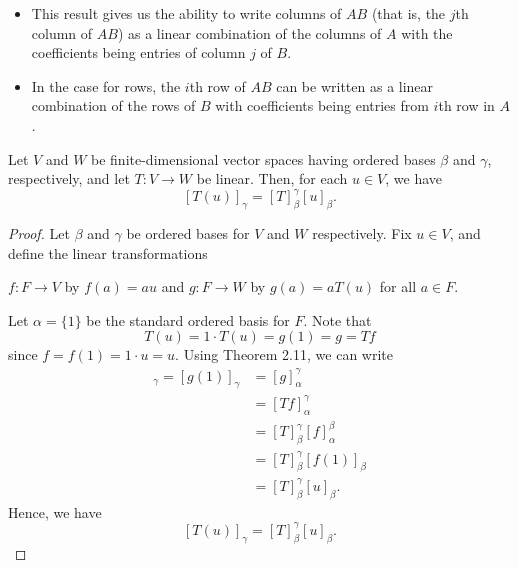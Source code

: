 \begin{itemize}
    \item This result gives us the ability to write columns of \( AB  \) (that is, the \( j \)th column of \( AB \)) as a linear combination of the columns of \( A  \) with the coefficients being entries of column \( j  \) of \( B  \).
    \item In the case for rows, the \( i \)th row of \( AB  \) can be written as a linear combination of the rows of \( B  \) with coefficients being entries from \( i \)th row in \( A  \).
\end{itemize}

\begin{theorem}
    Let \( V  \) and \( W  \) be finite-dimensional vector spaces having ordered bases \( \beta  \) and \( \gamma  \), respectively, and let \( T: V \to W  \) be linear. Then, for each \( u \in V  \), we have
    \[  [T(u)]_{\gamma}^{}  = [T]_{\beta}^{\gamma}  [u]_{\beta}^{}. \]
\end{theorem}
\begin{proof}
    Let \( \beta \) and \( \gamma \) be ordered bases for \( V  \) and \( W  \) respectively. Fix \( u \in V  \), and define the linear transformations 
    \begin{center}
        \( f: F \to V  \) by \( f(a) = au  \) and \( g: F \to W  \) by \( g(a) = aT(u) \) for all \( a \in F  \). 
    \end{center}
    Let \( \alpha = \{  1  \}  \) be the standard ordered basis for \( F  \). Note that 
    \[  T(u) = 1 \cdot T(u) = g(1) = g = Tf  \]
    since \( f = f(1)  = 1 \cdot u = u\). Using Theorem 2.11, we can write
    \begin{align*}
        [T(u)]_{\gamma}  = [g(1)]_{\gamma} &= [g]_{\alpha}^{\gamma}  \\
                                                 &= [Tf]_{\alpha}^{\gamma} \\
                                                 &= [T]_{\beta}^{\gamma} [f]_{\alpha}^{\beta} \\
                                                 &= [T]_{\beta}^{\gamma}  [f(1)]_{\beta}  \\
                                                 &= [T]_{\beta}^{\gamma}  [u]_{\beta}.
    \end{align*}
    Hence, we have
    \[  [T(u)]_{\gamma} = [T]_{\beta}^{\gamma}  [u]_{\beta}. \]
\end{proof}

